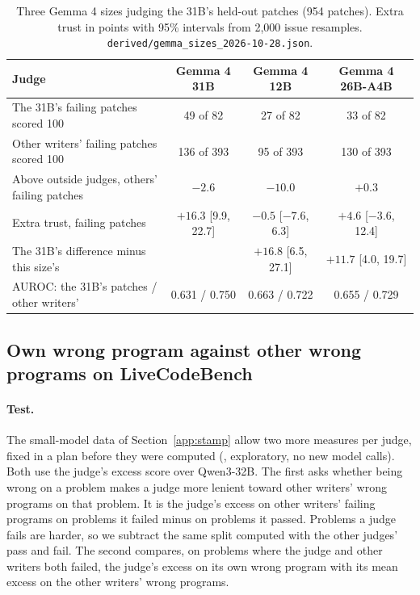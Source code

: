 \documentclass[10pt,letterpaper]{article}
\begin{document}
\begin{table}[H]
\centering
\small
\caption{Three Gemma 4 sizes judging the 31B's held-out patches (954 patches). Extra trust in points with 95\% intervals
from 2,000 issue resamples. \texttt{derived/gemma\_sizes\_2026-10-28.json}.}
\label{tab:sizes}
\setlength{\tabcolsep}{4pt}
\begin{tabular}{@{}lccc@{}}
\toprule
Judge & Gemma 4 31B & Gemma 4 12B & Gemma 4 26B-A4B \\
\midrule
The 31B's failing patches scored 100 & 49 of 82 & 27 of 82 & 33 of 82 \\
Other writers' failing patches scored 100 & 136 of 393 & 95 of 393 & 130 of 393 \\
Above outside judges, others' failing patches & $-2.6$ & $-10.0$ & $+0.3$ \\
Extra trust, failing patches & $+16.3$ [9.9, 22.7] & $-0.5$ [$-7.6$, 6.3] & $+4.6$ [$-3.6$, 12.4] \\
The 31B's difference minus this size's & & $+16.8$ [6.5, 27.1] & $+11.7$ [4.0, 19.7] \\
AUROC: the 31B's patches / other writers' & 0.631 / 0.750 & 0.663 / 0.722 & 0.655 / 0.729 \\
\bottomrule
\end{tabular}
\end{table}

\subsection*{Own wrong program against other wrong programs on LiveCodeBench}

\paragraph{Test.} The small-model data of Section~\ref{app:stamp} allow two more measures per judge, fixed in a plan
before they were computed (, exploratory, no new model calls). Both use the judge's
excess score over Qwen3-32B. The first asks whether being wrong on a problem makes a judge more lenient toward other
writers' wrong programs on that problem. It is the judge's excess on other writers' failing programs on problems it
failed minus on problems it passed. Problems a judge fails are harder, so we subtract the same split computed with the
other judges' pass and fail. The second compares, on problems where the judge and other writers both failed, the judge's excess on
its own wrong program with its mean excess on the other writers' wrong programs.
\end{document}
